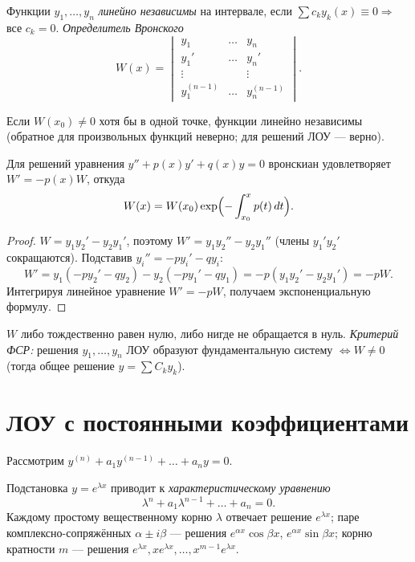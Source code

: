 \begin{definition}
Функции $y_1,\dots,y_n$ \emph{линейно независимы} на интервале, если
$\sum c_k y_k(x)\equiv0\Rightarrow$ все $c_k=0$. \emph{Определитель Вронского}
\[
  W(x)=\begin{vmatrix} y_1 & \dots & y_n\\ y_1' & \dots & y_n'\\ \vdots & & \vdots\\
  y_1^{(n-1)} & \dots & y_n^{(n-1)}\end{vmatrix}.
\]
\end{definition}

\begin{remark}
Если $W(x_0)\ne0$ хотя бы в одной точке, функции линейно независимы (обратное для произвольных
функций неверно; для решений ЛОУ — верно).
\end{remark}

\begin{theorem}
Для решений уравнения $y''+p(x)y'+q(x)y=0$ вронскиан удовлетворяет $W'=-p(x)W$, откуда
\[
  W(x)=W(x_0)\exp\Bigl(-\int_{x_0}^x p(t)\,dt\Bigr).
\]
\end{theorem}

\begin{proof}
$W=y_1y_2'-y_2y_1'$, поэтому $W'=y_1y_2''-y_2y_1''$ (члены $y_1'y_2'$ сокращаются). Подставив
$y_i''=-p y_i'-q y_i$:
\[
  W'=y_1(-p y_2'-q y_2)-y_2(-p y_1'-q y_1)=-p(y_1y_2'-y_2y_1')=-pW .
\]
Интегрируя линейное уравнение $W'=-pW$, получаем экспоненциальную формулу.
\end{proof}

\begin{corollary}
$W$ либо тождественно равен нулю, либо нигде не обращается в нуль. \emph{Критерий ФСР:} решения
$y_1,\dots,y_n$ ЛОУ образуют фундаментальную систему $\iff W\ne0$ (тогда общее решение
$y=\sum C_k y_k$).
\end{corollary}

\section{ЛОУ с постоянными коэффициентами}

Рассмотрим $y^{(n)}+a_1y^{(n-1)}+\dots+a_n y=0$.

\begin{theorem}
Подстановка $y=e^{\lambda x}$ приводит к \emph{характеристическому уравнению}
\[
  \lambda^n+a_1\lambda^{n-1}+\dots+a_n=0 .
\]
Каждому простому вещественному корню $\lambda$ отвечает решение $e^{\lambda x}$; паре
комплексно-сопряжённых $\alpha\pm i\beta$ — решения $e^{\alpha x}\cos\beta x$,
$e^{\alpha x}\sin\beta x$; корню кратности $m$ — решения $e^{\lambda x},xe^{\lambda x},\dots,x^{m-1}e^{\lambda x}$.
\end{theorem}

